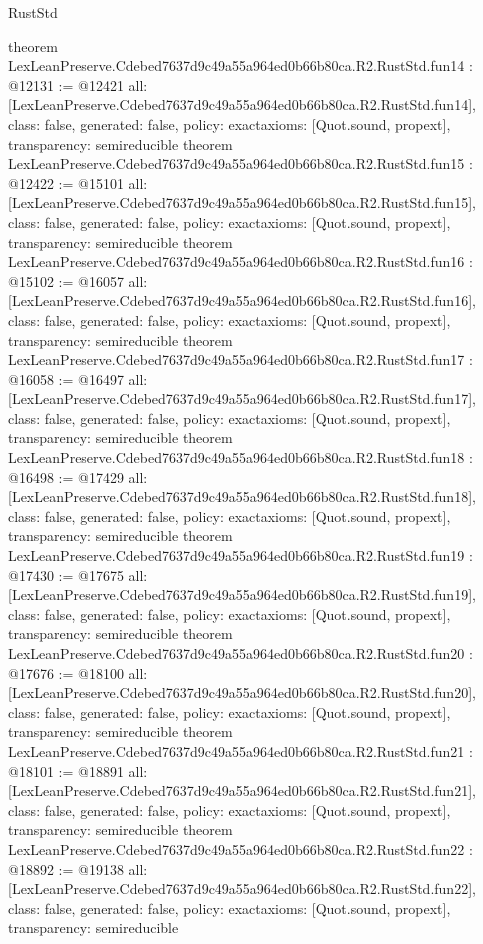 \begin{lexlean}{RustStd}
\begin{coremodule}
{}
theorem LexLeanPreserve.Cdebed7637d9c49a55a964ed0b66b80ca.R2.RustStd.fun14 : @12131 := @12421 {
  all: [LexLeanPreserve.Cdebed7637d9c49a55a964ed0b66b80ca.R2.RustStd.fun14],
  class: false,
  generated: false,
  policy: exact{axioms: [Quot.sound, propext]},
  transparency: semireducible
}
theorem LexLeanPreserve.Cdebed7637d9c49a55a964ed0b66b80ca.R2.RustStd.fun15 : @12422 := @15101 {
  all: [LexLeanPreserve.Cdebed7637d9c49a55a964ed0b66b80ca.R2.RustStd.fun15],
  class: false,
  generated: false,
  policy: exact{axioms: [Quot.sound, propext]},
  transparency: semireducible
}
theorem LexLeanPreserve.Cdebed7637d9c49a55a964ed0b66b80ca.R2.RustStd.fun16 : @15102 := @16057 {
  all: [LexLeanPreserve.Cdebed7637d9c49a55a964ed0b66b80ca.R2.RustStd.fun16],
  class: false,
  generated: false,
  policy: exact{axioms: [Quot.sound, propext]},
  transparency: semireducible
}
theorem LexLeanPreserve.Cdebed7637d9c49a55a964ed0b66b80ca.R2.RustStd.fun17 : @16058 := @16497 {
  all: [LexLeanPreserve.Cdebed7637d9c49a55a964ed0b66b80ca.R2.RustStd.fun17],
  class: false,
  generated: false,
  policy: exact{axioms: [Quot.sound, propext]},
  transparency: semireducible
}
theorem LexLeanPreserve.Cdebed7637d9c49a55a964ed0b66b80ca.R2.RustStd.fun18 : @16498 := @17429 {
  all: [LexLeanPreserve.Cdebed7637d9c49a55a964ed0b66b80ca.R2.RustStd.fun18],
  class: false,
  generated: false,
  policy: exact{axioms: [Quot.sound, propext]},
  transparency: semireducible
}
theorem LexLeanPreserve.Cdebed7637d9c49a55a964ed0b66b80ca.R2.RustStd.fun19 : @17430 := @17675 {
  all: [LexLeanPreserve.Cdebed7637d9c49a55a964ed0b66b80ca.R2.RustStd.fun19],
  class: false,
  generated: false,
  policy: exact{axioms: [Quot.sound, propext]},
  transparency: semireducible
}
theorem LexLeanPreserve.Cdebed7637d9c49a55a964ed0b66b80ca.R2.RustStd.fun20 : @17676 := @18100 {
  all: [LexLeanPreserve.Cdebed7637d9c49a55a964ed0b66b80ca.R2.RustStd.fun20],
  class: false,
  generated: false,
  policy: exact{axioms: [Quot.sound, propext]},
  transparency: semireducible
}
theorem LexLeanPreserve.Cdebed7637d9c49a55a964ed0b66b80ca.R2.RustStd.fun21 : @18101 := @18891 {
  all: [LexLeanPreserve.Cdebed7637d9c49a55a964ed0b66b80ca.R2.RustStd.fun21],
  class: false,
  generated: false,
  policy: exact{axioms: [Quot.sound, propext]},
  transparency: semireducible
}
theorem LexLeanPreserve.Cdebed7637d9c49a55a964ed0b66b80ca.R2.RustStd.fun22 : @18892 := @19138 {
  all: [LexLeanPreserve.Cdebed7637d9c49a55a964ed0b66b80ca.R2.RustStd.fun22],
  class: false,
  generated: false,
  policy: exact{axioms: [Quot.sound, propext]},
  transparency: semireducible
}
\end{coremodule}
\end{lexlean}
